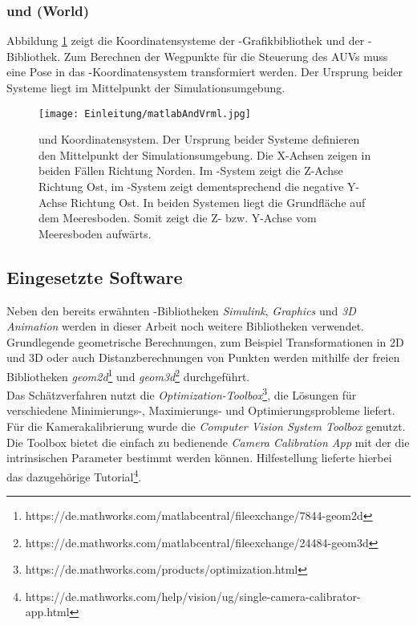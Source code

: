 \subsubsection{\matlab und \vrml (World)}
Abbildung \ref{Abb. 3} zeigt die Koordinatensysteme der \matlab -Grafikbibliothek und der \textit{\vrml} -Bibliothek. Zum Berechnen der Wegpunkte für die Steuerung des AUVs muss eine Pose in das \vrml -Koordinatensystem transformiert werden. Der Ursprung beider Systeme liegt im Mittelpunkt der Simulationsumgebung.
\begin{figure}[H]
	\centering
	\texttt{[image: Einleitung/matlabAndVrml.jpg]}
	\caption[\matlab und \vrml Koordinatensystem]{\matlab und \vrml Koordinatensystem. Der Ursprung beider Systeme definieren den Mittelpunkt der Simulationsumgebung. Die X-Achsen zeigen in beiden Fällen Richtung Norden. Im \vrml -System zeigt die Z-Achse Richtung Ost, im \matlab -System zeigt dementsprechend die negative Y-Achse Richtung Ost.  In beiden Systemen liegt die Grundfläche auf dem Meeresboden. Somit zeigt die Z- bzw. Y-Achse vom Meeresboden aufwärts.}
	\label{Abb. 3}
\end{figure}

\subsection{Eingesetzte Software}
Neben den bereits erwähnten \matlab -Bibliotheken \textit{Simulink}, \textit{Graphics} und \textit{3D Animation} werden in dieser Arbeit noch weitere Bibliotheken verwendet.\\
Grundlegende geometrische Berechnungen, zum Beispiel Transformationen in 2D und 3D oder auch Distanzberechnungen von Punkten werden mithilfe der freien Bibliotheken \textit{geom2d}\footnote{https://de.mathworks.com/matlabcentral/fileexchange/7844-geom2d} und \textit{geom3d}\footnote{https://de.mathworks.com/matlabcentral/fileexchange/24484-geom3d} durchgeführt.\\
Das Schätzverfahren nutzt die \textit{Optimization-Toolbox}\footnote{https://de.mathworks.com/products/optimization.html}, die Lösungen für verschiedene Minimierungs-, Maximierungs- und Optimierungsprobleme liefert.\\
Für die Kamerakalibrierung wurde die \textit{Computer Vision System Toolbox} genutzt. Die Toolbox bietet die einfach zu bedienende \textit{Camera Calibration App} mit der die intrinsischen Parameter bestimmt werden können.
Hilfestellung lieferte hierbei das dazugehörige Tutorial\footnote{https://de.mathworks.com/help/vision/ug/single-camera-calibrator-app.html}.\\
